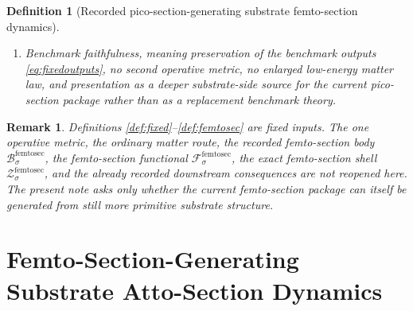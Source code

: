 \documentclass[11pt]{article}
\newcommand{\PicoSectionShell}[1]{\mathcal Z_{#1}^{\mathrm{picosec}}}
\newcommand{\FemtoSectionBody}[1]{\mathcal B_{#1}^{\mathrm{femtosec}}}
\newcommand{\FemtoSectionProj}[1]{\Pi_{#1}^{\mathrm{femtosec}}}
\newcommand{\FemtoSectionFiber}[2]{\mathcal F_{#1}^{\mathrm{femtosec}}(#2)}
\newcommand{\FemtoSectionFunctional}[1]{\mathscr F_{#1}^{\mathrm{femtosec}}}
\newcommand{\FemtoSectionShell}[1]{\mathcal Z_{#1}^{\mathrm{femtosec}}}
\newtheorem{definition}{Definition}
\newtheorem{remark}{Remark}
\begin{document}
\begin{definition}[Recorded pico-section-generating substrate femto-section dynamics]
\begin{enumerate}
\[\begin{array}{l}
    \FemtoSectionFunctional{\sigma}(t)
    =
    \displaystyle\min_{u\in\FemtoSectionFiber{\sigma}{\FemtoSectionProj{\sigma}(t)}}
    \FemtoSectionFunctional{\sigma}(u)
    \end{array}
    \right\},
    \]
    and
    \[
    \FemtoSectionProj{\sigma}\big|_{\FemtoSectionShell{\sigma}}
    :
    \FemtoSectionShell{\sigma}
    \xrightarrow{\cong}
    \PicoSectionShell{\sigma}
    \]
    is a diffeomorphism.
    \item Benchmark faithfulness, meaning preservation of the benchmark outputs \eqref{eq:fixedoutputs}, no second operative metric, no enlarged low-energy matter law, and presentation as a deeper substrate-side source for the current pico-section package rather than as a replacement benchmark theory.
\end{enumerate}
\end{definition}

\begin{remark}
Definitions \ref{def:fixed}--\ref{def:femtosec} are fixed inputs. The one operative metric, the ordinary matter route, the recorded femto-section body \(\FemtoSectionBody{\sigma}\), the femto-section functional \(\FemtoSectionFunctional{\sigma}\), the exact femto-section shell \(\FemtoSectionShell{\sigma}\), and the already recorded downstream consequences are not reopened here. The present note asks only whether the current femto-section package can itself be generated from still more primitive substrate structure.
\end{remark}

\section{Femto-Section-Generating Substrate Atto-Section Dynamics}
\end{document}

